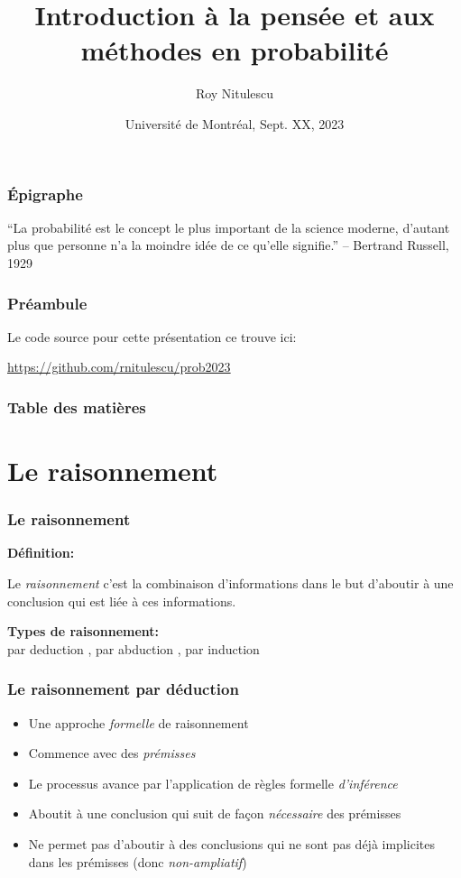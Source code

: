 \documentclass{beamer}
\title{Introduction à la pensée et aux méthodes en probabilité}
\author{Roy Nitulescu\inst{1}}
\institute
{
    \inst{1}%
    CITADEL\\
    CR-CHUM
}
\date[UdeM, Sept. XX, 2023]{Université de Montréal, Sept. XX, 2023}
\begin{document}

\frame{\titlepage}

\begin{frame}
    \frametitle{Épigraphe}
    ``La probabilité est le concept le plus important de la science moderne,
    d'autant plus que personne n'a la moindre idée de ce qu'elle signifie.'' -- Bertrand Russell, 1929
\end{frame}


\begin{frame}
    \frametitle{Préambule}
    
    Le code source pour cette présentation ce trouve ici:

    \vfill

    \url{https://github.com/rnitulescu/prob2023}
\end{frame}


\begin{frame}
    \frametitle{Table des matières}
    \tableofcontents
\end{frame}



\section{Le raisonnement}

\begin{frame}
    \frametitle{Le raisonnement}
    \textbf{Définition:}\

    \bigskip

    Le \emph{raisonnement} c’est la combinaison d’informations dans le
    but d’aboutir à une conclusion qui est liée à ces informations.\\

    \vfill \pause

    \textbf{Types de raisonnement:}\\

     par deduction \pause, par abduction \pause, par induction
\end{frame}


\begin{frame}
    \frametitle{Le raisonnement par déduction}
    \begin{itemize}
      \item Une approche \emph{formelle} de raisonnement \pause
      \item Commence avec des \emph{prémisses} \pause
      \item Le processus avance par l’application de règles formelle \emph{d’inférence} \pause
      \item Aboutit à une conclusion qui suit de façon \emph{nécessaire} des prémisses \pause
      \item Ne permet pas d’aboutir à des conclusions qui ne sont pas déjà
            implicites dans les prémisses (donc \emph{non-ampliatif})
    \end{itemize}
\end{frame}
\end{document}
